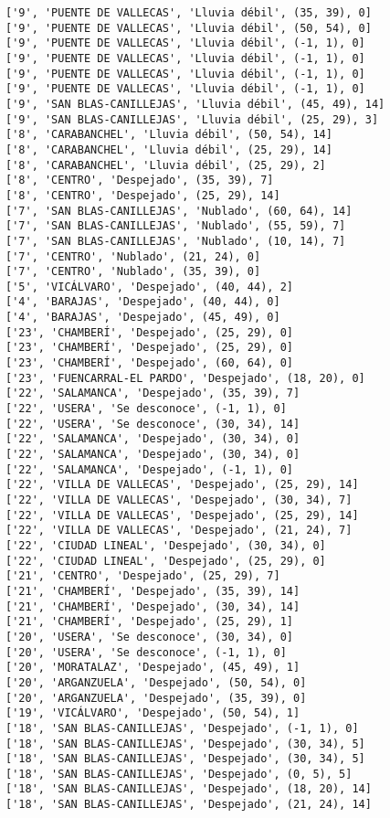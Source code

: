 \documentclass[11pt]{article}
\begin{document}
\begin{Verbatim}[commandchars=\\\{\}]
['9', 'PUENTE DE VALLECAS', 'Lluvia débil', (35, 39), 0]
['9', 'PUENTE DE VALLECAS', 'Lluvia débil', (50, 54), 0]
['9', 'PUENTE DE VALLECAS', 'Lluvia débil', (-1, 1), 0]
['9', 'PUENTE DE VALLECAS', 'Lluvia débil', (-1, 1), 0]
['9', 'PUENTE DE VALLECAS', 'Lluvia débil', (-1, 1), 0]
['9', 'PUENTE DE VALLECAS', 'Lluvia débil', (-1, 1), 0]
['9', 'SAN BLAS-CANILLEJAS', 'Lluvia débil', (45, 49), 14]
['9', 'SAN BLAS-CANILLEJAS', 'Lluvia débil', (25, 29), 3]
['8', 'CARABANCHEL', 'Lluvia débil', (50, 54), 14]
['8', 'CARABANCHEL', 'Lluvia débil', (25, 29), 14]
['8', 'CARABANCHEL', 'Lluvia débil', (25, 29), 2]
['8', 'CENTRO', 'Despejado', (35, 39), 7]
['8', 'CENTRO', 'Despejado', (25, 29), 14]
['7', 'SAN BLAS-CANILLEJAS', 'Nublado', (60, 64), 14]
['7', 'SAN BLAS-CANILLEJAS', 'Nublado', (55, 59), 7]
['7', 'SAN BLAS-CANILLEJAS', 'Nublado', (10, 14), 7]
['7', 'CENTRO', 'Nublado', (21, 24), 0]
['7', 'CENTRO', 'Nublado', (35, 39), 0]
['5', 'VICÁLVARO', 'Despejado', (40, 44), 2]
['4', 'BARAJAS', 'Despejado', (40, 44), 0]
['4', 'BARAJAS', 'Despejado', (45, 49), 0]
['23', 'CHAMBERÍ', 'Despejado', (25, 29), 0]
['23', 'CHAMBERÍ', 'Despejado', (25, 29), 0]
['23', 'CHAMBERÍ', 'Despejado', (60, 64), 0]
['23', 'FUENCARRAL-EL PARDO', 'Despejado', (18, 20), 0]
['22', 'SALAMANCA', 'Despejado', (35, 39), 7]
['22', 'USERA', 'Se desconoce', (-1, 1), 0]
['22', 'USERA', 'Se desconoce', (30, 34), 14]
['22', 'SALAMANCA', 'Despejado', (30, 34), 0]
['22', 'SALAMANCA', 'Despejado', (30, 34), 0]
['22', 'SALAMANCA', 'Despejado', (-1, 1), 0]
['22', 'VILLA DE VALLECAS', 'Despejado', (25, 29), 14]
['22', 'VILLA DE VALLECAS', 'Despejado', (30, 34), 7]
['22', 'VILLA DE VALLECAS', 'Despejado', (25, 29), 14]
['22', 'VILLA DE VALLECAS', 'Despejado', (21, 24), 7]
['22', 'CIUDAD LINEAL', 'Despejado', (30, 34), 0]
['22', 'CIUDAD LINEAL', 'Despejado', (25, 29), 0]
['21', 'CENTRO', 'Despejado', (25, 29), 7]
['21', 'CHAMBERÍ', 'Despejado', (35, 39), 14]
['21', 'CHAMBERÍ', 'Despejado', (30, 34), 14]
['21', 'CHAMBERÍ', 'Despejado', (25, 29), 1]
['20', 'USERA', 'Se desconoce', (30, 34), 0]
['20', 'USERA', 'Se desconoce', (-1, 1), 0]
['20', 'MORATALAZ', 'Despejado', (45, 49), 1]
['20', 'ARGANZUELA', 'Despejado', (50, 54), 0]
['20', 'ARGANZUELA', 'Despejado', (35, 39), 0]
['19', 'VICÁLVARO', 'Despejado', (50, 54), 1]
['18', 'SAN BLAS-CANILLEJAS', 'Despejado', (-1, 1), 0]
['18', 'SAN BLAS-CANILLEJAS', 'Despejado', (30, 34), 5]
['18', 'SAN BLAS-CANILLEJAS', 'Despejado', (30, 34), 5]
['18', 'SAN BLAS-CANILLEJAS', 'Despejado', (0, 5), 5]
['18', 'SAN BLAS-CANILLEJAS', 'Despejado', (18, 20), 14]
['18', 'SAN BLAS-CANILLEJAS', 'Despejado', (21, 24), 14]

\end{Verbatim}
\end{document}

